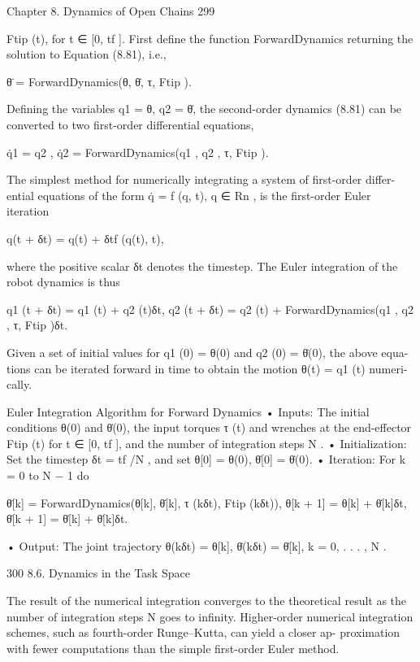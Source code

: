 \documentclass[12pt,a4paper]{article}
\begin{document}
Chapter 8. Dynamics of Open Chains                                                                  299

Ftip (t), for t ∈ [0, tf ]. First define the function ForwardDynamics returning the
solution to Equation (8.81), i.e.,

                               θ̈ = ForwardDynamics(θ, θ̇, τ, Ftip ).

Defining the variables q1 = θ, q2 = θ̇, the second-order dynamics (8.81) can be
converted to two first-order differential equations,

                         q̇1    = q2 ,
                         q̇2    = ForwardDynamics(q1 , q2 , τ, Ftip ).

The simplest method for numerically integrating a system of first-order differ-
ential equations of the form q̇ = f (q, t), q ∈ Rn , is the first-order Euler iteration

                                  q(t + δt) = q(t) + δtf (q(t), t),

where the positive scalar δt denotes the timestep. The Euler integration of the
robot dynamics is thus

              q1 (t + δt) = q1 (t) + q2 (t)δt,
              q2 (t + δt) = q2 (t) + ForwardDynamics(q1 , q2 , τ, Ftip )δt.

Given a set of initial values for q1 (0) = θ(0) and q2 (0) = θ̇(0), the above equa-
tions can be iterated forward in time to obtain the motion θ(t) = q1 (t) numeri-
cally.

Euler Integration Algorithm for Forward Dynamics
    • Inputs: The initial conditions θ(0) and θ̇(0), the input torques τ (t) and
      wrenches at the end-effector Ftip (t) for t ∈ [0, tf ], and the number of
      integration steps N .
    • Initialization: Set the timestep δt = tf /N , and set θ[0] = θ(0), θ̇[0] =
      θ̇(0).
    • Iteration: For k = 0 to N − 1 do

                     θ̈[k]     = ForwardDynamics(θ[k], θ̇[k], τ (kδt), Ftip (kδt)),
                θ[k + 1] = θ[k] + θ̇[k]δt,
                θ̇[k + 1] = θ̇[k] + θ̈[k]δt.

    • Output: The joint trajectory θ(kδt) = θ[k], θ̇(kδt) = θ̇[k], k = 0, . . . , N .


300                                                            8.6. Dynamics in the Task Space

    The result of the numerical integration converges to the theoretical result
as the number of integration steps N goes to infinity. Higher-order numerical
integration schemes, such as fourth-order Runge–Kutta, can yield a closer ap-
proximation with fewer computations than the simple first-order Euler method.
\end{document}
